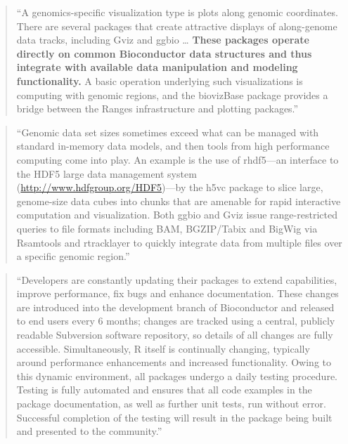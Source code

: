 \documentclass[]{tufte-book}
\begin{document}
\begin{quote}
``A genomics-specific visualization type is plots along genomic coordinates.
There are several packages that create attractive displays of along-genome data
tracks, including Gviz and ggbio \ldots{} \textbf{These packages operate directly on common
Bioconductor data structures and thus integrate with available data manipulation
and modeling functionality.} A basic operation underlying such visualizations
is computing with genomic regions, and the biovizBase package provides a bridge
between the Ranges infrastructure and plotting packages.''
\citep{huber2015orchestrating}
\end{quote}

\begin{quote}
``Genomic data set sizes sometimes exceed what can be managed with standard
in-memory data models, and then tools from high performance computing come into
play. An example is the use of rhdf5---an interface to the HDF5 large data
management system (\url{http://www.hdfgroup.org/HDF5})---by the h5vc package to slice
large, genome-size data cubes into chunks that are amenable for rapid
interactive computation and visualization. Both ggbio and Gviz issue
range-restricted queries to file formats including BAM, BGZIP/Tabix and BigWig
via Rsamtools and rtracklayer to quickly integrate data from multiple files over
a specific genomic region.'' \citep{huber2015orchestrating}
\end{quote}

\begin{quote}
``Developers are constantly updating their packages to extend capabilities, improve performance, fix bugs and enhance documentation. These changes are introduced into the development branch of
Bioconductor and released to end users every 6 months; changes are
tracked using a central, publicly readable Subversion software repository, so details of all changes are fully accessible. Simultaneously,
R itself is continually changing, typically around performance
enhancements and increased functionality. Owing to this dynamic
environment, all packages undergo a daily testing procedure. Testing
is fully automated and ensures that all code examples in the package documentation, as well as further unit tests, run without error.
Successful completion of the testing will result in the package being
built and presented to the community.'' \citep{huber2015orchestrating}
\end{quote}
\end{document}
